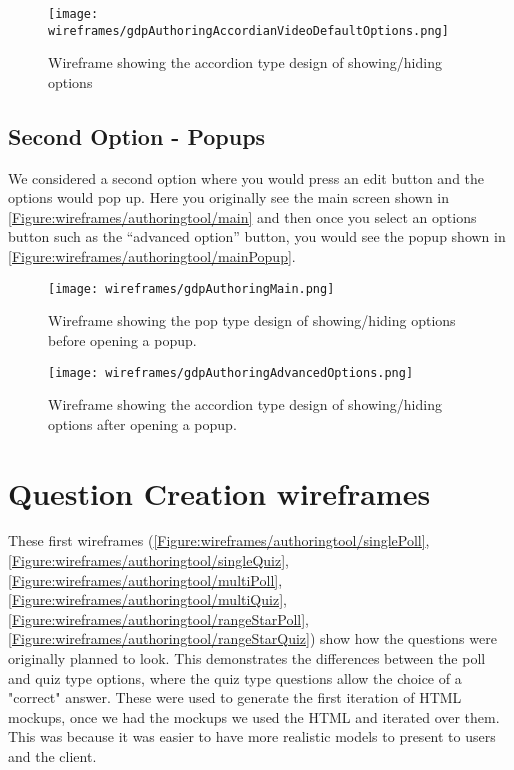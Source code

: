 \begin{figure}
	\texttt{[image: wireframes/gdpAuthoringAccordianVideoDefaultOptions.png]}
	\caption{Wireframe showing the accordion type design of showing/hiding options}
	\label{Figure:wireframes/authoringtool/accordion}
\end{figure}

\subsection{Second Option - Popups}

We considered a second option where you would press an edit button and the options would pop up. Here you originally see the main screen shown in \autoref{Figure:wireframes/authoringtool/main} and then once you select an options button such as the ``advanced option'' button, you would see the popup shown in \autoref{Figure:wireframes/authoringtool/mainPopup}.

\begin{landscape}

\begin{figure}
	\texttt{[image: wireframes/gdpAuthoringMain.png]}
	\caption{Wireframe showing the pop type design of showing/hiding options before opening a popup.}
	\label{Figure:wireframes/authoringtool/main}
\end{figure}

\begin{figure}
	\texttt{[image: wireframes/gdpAuthoringAdvancedOptions.png]}
	\caption{Wireframe showing the accordion type design of showing/hiding options after opening a popup.}
	\label{Figure:wireframes/authoringtool/mainPopup}
\end{figure}
\end{landscape}


\section{Question Creation wireframes}

These first wireframes (\autoref{Figure:wireframes/authoringtool/singlePoll}, \autoref{Figure:wireframes/authoringtool/singleQuiz}, \autoref{Figure:wireframes/authoringtool/multiPoll}, \autoref{Figure:wireframes/authoringtool/multiQuiz}, \autoref{Figure:wireframes/authoringtool/rangeStarPoll}, \autoref{Figure:wireframes/authoringtool/rangeStarQuiz}) show how the questions were originally planned to look. This demonstrates the differences between the poll and quiz type options, where the quiz type questions allow the choice of a "correct" answer. These were used to generate the first iteration of HTML mockups, once we had the mockups we used the HTML and iterated over them. This was because it was easier to have more realistic models to present to users and the client.

